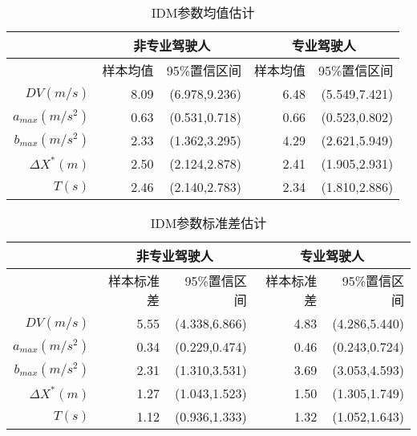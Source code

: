 \begin{table}[htbp]
  \centering
  \caption{IDM参数均值估计}
    \begin{tabular}{rrrrr}
    \addlinespace
    \toprule
          & \multicolumn{ 2}{c}{非专业驾驶人} & \multicolumn{ 2}{c}{专业驾驶人} \\
    \midrule
          & 样本均值  & 95\%置信区间 & 样本均值  & 95\%置信区间 \\
    $DV(m/s)$ & 8.09  & (6.978,9.236) & 6.48  & (5.549,7.421) \\
    $a_{max}(m/s^2)$ & 0.63  & (0.531,0.718) & 0.66  & (0.523,0.802) \\
    $b_{max}(m/s^2)$ & 2.33  & (1.362,3.295) & 4.29  & (2.621,5.949) \\
    $\Delta X^*(m)$     & 2.50  & (2.124,2.878) & 2.41  & (1.905,2.931) \\
    $T(s)$     & 2.46  & (2.140,2.783) & 2.34  & (1.810,2.886) \\
    \bottomrule
    \end{tabular}%
  \label{boot-mean}%
\end{table}%

\begin{table}[htbp]
  \centering
  \caption{IDM参数标准差估计}
    \begin{tabular}{rrrrr}
    \addlinespace
    \toprule
          & \multicolumn{ 2}{c}{非专业驾驶人} & \multicolumn{ 2}{c}{专业驾驶人} \\
    \midrule
          & 样本标准差 & 95\%置信区间 & 样本标准差 & 95\%置信区间 \\
    $DV(m/s)$ & 5.55  & (4.338,6.866) & 4.83  & (4.286,5.440) \\
    $a_{max}(m/s^2)$ & 0.34  & (0.229,0.474) & 0.46  & (0.243,0.724) \\
    $b_{max}(m/s^2)$ & 2.31  & (1.310,3.531) & 3.69  & (3.053,4.593) \\
    $\Delta X^*(m)$    & 1.27  & (1.043,1.523) & 1.50  & (1.305,1.749) \\
    $T(s)$      & 1.12  & (0.936,1.333) & 1.32  & (1.052,1.643) \\
    \bottomrule
    \end{tabular}%
  \label{boot-sd}%
\end{table}%

